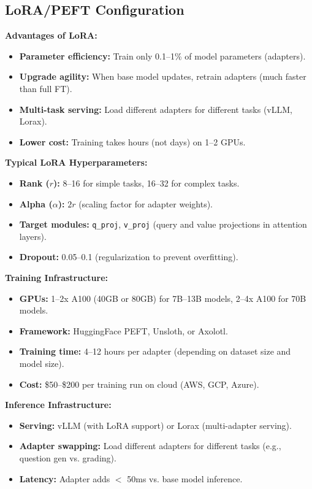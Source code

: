 \documentclass[11pt,letterpaper]{article}
\begin{document}
\subsection{LoRA/PEFT Configuration}\label{subsec:lora-peft-config}

\textbf{Advantages of LoRA:}
\begin{itemize}
\item \textbf{Parameter efficiency:} Train only 0.1--1\% of model parameters (adapters).
\item \textbf{Upgrade agility:} When base model updates, retrain adapters (much faster than full FT).
\item \textbf{Multi-task serving:} Load different adapters for different tasks (vLLM, Lorax).
\item \textbf{Lower cost:} Training takes hours (not days) on 1--2 GPUs.
\end{itemize}

\textbf{Typical LoRA Hyperparameters:}
\begin{itemize}
\item \textbf{Rank ($r$):} 8--16 for simple tasks, 16--32 for complex tasks.
\item \textbf{Alpha ($\alpha$):} $2r$ (scaling factor for adapter weights).
\item \textbf{Target modules:} \texttt{q\_proj}, \texttt{v\_proj} (query and value projections in attention layers).
\item \textbf{Dropout:} 0.05--0.1 (regularization to prevent overfitting).
\end{itemize}

\textbf{Training Infrastructure:}
\begin{itemize}
\item \textbf{GPUs:} 1--2x A100 (40GB or 80GB) for 7B--13B models, 2--4x A100 for 70B models.
\item \textbf{Framework:} HuggingFace PEFT, Unsloth, or Axolotl.
\item \textbf{Training time:} 4--12 hours per adapter (depending on dataset size and model size).
\item \textbf{Cost:} \$50--\$200 per training run on cloud (AWS, GCP, Azure).
\end{itemize}

\textbf{Inference Infrastructure:}
\begin{itemize}
\item \textbf{Serving:} vLLM (with LoRA support) or Lorax (multi-adapter serving).
\item \textbf{Adapter swapping:} Load different adapters for different tasks (e.g., question gen vs. grading).
\item \textbf{Latency:} Adapter adds $<$ 50ms vs. base model inference.
\end{itemize}
\end{document}
